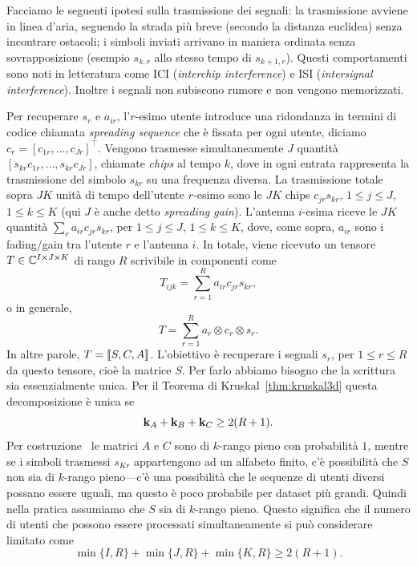 Facciamo le seguenti ipotesi sulla trasmissione dei segnali: la trasmissione avviene in linea
d'aria, seguendo la strada più breve (secondo la distanza euclidea) senza incontrare ostacoli; i
simboli inviati arrivano in maniera ordinata senza sovrapposizione (esempio $ s_{k,r} $ allo stesso
tempo di $ s_{k+1,r} $). Questi comportamenti sono noti in letteratura come ICI (\emph{interchip
	interference}) e ISI (\emph{intersignal interference}).
Inoltre i segnali non subiscono rumore e non vengono memorizzati.

Per recuperare $ s_{r}
$ e $ a_{ir} $, l'$ r $-esimo utente
introduce una ridondanza in termini di codice chiamata \emph{spreading sequence} che è fissata per
ogni utente, diciamo $ c_{r} = \left[ c_{1r}, \ldots, c_{Jr} \right]^{\top} $. Vengono trasmesse simultaneamente $ J $ quantità
$ \left[ s_{kr}c_{1r}, \ldots, s_{kr}c_{Jr} \right] $, chiamate \emph{chips} al tempo $ k $, dove in
ogni entrata rappresenta la trasmissione del simbolo $ s_{kr} $ su una frequenza diversa. La
trasmissione totale sopra $ JK $ unità di tempo dell'utente $ r $-esimo sono le $ JK $ chips $
	c_{jr}s_{kr} $, $ 1 \le j \le J $, $ 1\le k \le K $ (qui $ J $ è anche detto \emph{spreading gain}).
L'antenna $ i $-esima riceve le $ JK $ quantità $ \sum_{r} a_{ir}c_{jr}s_{kr} $, per $ 1 \le j \le J
$, $ 1 \le k \le K $, dove, come sopra, $ a_{ir} $ sono i fading/gain tra l'utente $ r $ e l'antenna
$ i $. In totale, viene ricevuto un tensore $ T \in \mathbb{C}^{I \times J\times K} $ di rango $ R $
scrivibile in componenti come
\begin{equation}
	\label{eq:blindec_cp_components}
	T_{ijk} = \sum_{r=1}^R a_{ir}c_{jr}s_{kr},
\end{equation}
o in generale,
\begin{equation*}
	T = \sum_{r=1}^R a_{r} \otimes c_{r} \otimes s_{r}.
\end{equation*}
In altre parole, $ T = \dsqr{S,C,A} $. L'obiettivo è recuperare i segnali $ s_{r} $, per $ 1\le r\le
	R $ da questo tensore, cioè la matrice $ S $. Per farlo abbiamo bisogno che la scrittura sia
essenzialmente unica. Per il Teorema di Kruskal~\ref{thm:kruskal3d} questa decomposizione è unica se
\begin{equation*}
	\mathbf{k}_{A} + \mathbf{k}_{B} + \mathbf{k}_{C} \ge 2(R+1).
\end{equation*}
Per costruzione~\cite{de2008blind} le matrici $ A $ e $ C $ sono di $ k $-rango pieno con probabilità $ 1
$, mentre se i simboli trasmessi $ s_{Kr} $ appartengono ad un alfabeto finito, c'è possibilità che
$ S $ non sia di $ k $-rango pieno---c'è una possibilità che le sequenze di utenti diversi possano essere
uguali, ma questo è poco probabile per dataset più grandi. Quindi nella pratica assumiamo che $ S $
sia di $ k $-rango pieno. Questo significa che il numero di utenti che possono essere processati
simultaneamente si può considerare limitato come
\begin{equation}
	\label{eq:krk_eq_full_rank}
	\min \{I,R\} + \min \{J,R\} + \min \{K,R\} \ge 2(R+1).
\end{equation}

